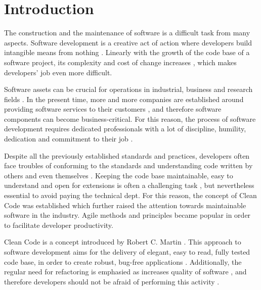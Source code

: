 \documentclass[conference]{IEEEtran}
\begin{document}

\section{Introduction}
The construction and the maintenance of software is a difficult task from many aspects. Software development is a creative act of action where developers build intangible means from nothing \cite{cleancoder}. Linearly with the growth of the code base of a software project, its complexity and cost of change increases \cite{codecomplete} \cite{cleancode}, which makes developers' job even more difficult. 

Software assets can be crucial for operations in industrial, business and research fields \cite{cleancode} \cite{cleancoder}. In the present time, more and more companies are established around providing software services to their customers \cite{cusumano2008changing}, and therefore software components can become business-critical. For this reason, the process of software development requires dedicated professionals with a lot of discipline, humility, dedication and commitment to their job \cite{cleancode}. 

Despite all the previously established standards and practices, developers often face troubles of conforming to the standards and understanding code written by others and even themselves \cite{cleancoder}. Keeping the code base maintainable, easy to understand and open for extensions is often a challenging task \cite{cleancoder}, but nevertheless essential to avoid paying the technical dept. For this reason, the concept of Clean Code \cite{cleancode} was established which further raised the attention towards maintainable software in the industry. Agile methods and principles became popular in order to facilitate developer productivity. 

Clean Code is a concept introduced by Robert C. Martin \cite{cleancode} \cite{cleancoder}. This approach to software development aims for the delivery of elegant, easy to read, fully tested code base, in order to create robust, bug-free applications \cite{cleancode}. Additionally, the regular need for refactoring is emphasied as increases quality of software \cite{impactofrefactoring}, and therefore developers should not be afraid of performing this activity \cite{cleancoder}. 
\end{document}
